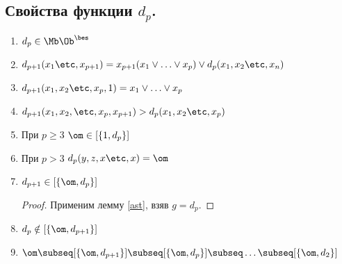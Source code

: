 \documentclass[unicode, 10pt, a4paper, oneside, fleqn]{article}
\begin{document}
\subsection{Свойства функции $d_p$.}
\begin{enumerate}
  \item 
    \begin{math}
      d_p \in \Mb\Oib
    \end{math}
  \item 
    \begin{math}
      d_{p+1}(\seti[x]{1}{p+1}) =x_{p+1}(\svee[x]{1}{p})\vee d_p(\set[x]{n})
    \end{math}
  \item 
    \begin{math}
      d_{p+1}(\set[x]{p},1) = \svee[x]{1}{p}
    \end{math}
  \item 
    \begin{math}
      d_{p+1}(x_1, x_2,\etc, x_p, x_{p+1}) > d_p(x_1, x_2\etc, x_p)
    \end{math}
  \item 
    \begin{lemma}
      При $p \ge 3$ $\om \in \cls{1, d_p}$
    \end{lemma}
  \item 
    \begin{lemma}
      При $p>3$ $d_p(y,z,x\etc, x) = \om$ \WHY
    \end{lemma}
  \item 
    \begin{lemma}
      $d_{p+1}\in \cls{\om, d_p}$
    \end{lemma}
    \begin{proof}
        Применим лемму \ref{ast}, взяв $g=d_p$. \THEN
    \end{proof}
  \item
    \begin{stm}
      \begin{math}
        d_p \notin \cls{\om, d_{p+1}}
      \end{math}
      \WHY
    \end{stm}
 \item 
   \begin{math}
     \om \subseq \cls{\om,d_{p+1}} \subseq \cls{\om,d_p} \subseq\ldots\subseq\cls{\om,d_2}
   \end{math}
\end{enumerate}
\end{document}
